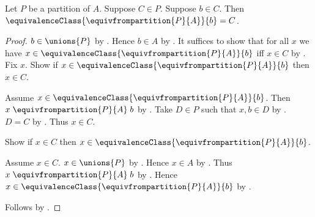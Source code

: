 \begin{lemma}\label{partition_block_is_equivalence_class}
    Let $P$ be a partition of $A$.
    Suppose $C\in P$.
    Suppose $b\in C$.
    Then $\equivalenceClass{\equivfrompartition{P}{A}}{b}=C$.
\end{lemma}
\begin{proof}
    $b\in\unions{P}$ by .
    Hence $b\in A$ by .
    It suffices to show that for all $x$ we have
        $x\in\equivalenceClass{\equivfrompartition{P}{A}}{b}$ iff $x\in C$
        by .
    Fix $x$.
    Show if $x\in\equivalenceClass{\equivfrompartition{P}{A}}{b}$ then $x\in C$.
    \begin{subproof}
        Assume $x\in\equivalenceClass{\equivfrompartition{P}{A}}{b}$.
        Then $x\mathrel{\equivfrompartition{P}{A}}b$
            by .
        Take $D\in P$ such that $x,b\in D$
            by .
        $D=C$ by .
        Thus $x\in C$.
    \end{subproof}
    Show if $x\in C$ then
        $x\in\equivalenceClass{\equivfrompartition{P}{A}}{b}$.
    \begin{subproof}
        Assume $x\in C$.
        $x\in\unions{P}$ by .
        Hence $x\in A$ by .
        Thus $x\mathrel{\equivfrompartition{P}{A}}b$
            by .
        Hence $x\in\equivalenceClass{\equivfrompartition{P}{A}}{b}$
            by .
    \end{subproof}
    Follows by \auto.
\end{proof}

